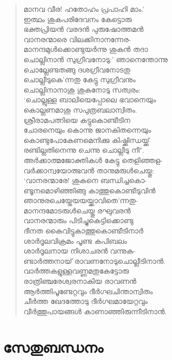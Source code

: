 \begin{verse}
മാനവ വീര! ഹതോഹം പ്രപാഹി മാം.’\\
ഇത്ഥം ശുകപരിദേവനം കേട്ടൊരു\\
ഭക്തപ്രിയന്‍ വരദന്‍ പുരുഷോത്തമന്‍\\
വാനരന്മാരെ വിലക്കിനാനന്നേര-\\
മാനന്ദമുള്‍ക്കൊണ്ടുയര്‍ന്നു ശുകന്‍ തദാ\\
ചൊല്ലിനാന്‍ സുഗ്രീവനോടു:’ ഞാനെന്തോന്നു\\
ചൊല്ലേണ്ടതങ്ങു ദശഗ്രീവനോടതു\\
ചൊല്ലീടുകെ’ന്നതു കേട്ടു സുഗ്രീവനും\\
ചൊല്ലിനാനാശു ശുകനോടു സത്വരം:\\
‘ചൊല്ലുള്ള ബാലിയെപ്പോലെ ഭവാനെയും\\
കൊല്ലണമാശു സപുത്രബലാന്വിതം.\\
ശ്രീരാമപത്നിയെ കട്ടുകൊണ്ടീടിന\\
ചോരനെയും കൊന്നു ജാനകിതന്നെയും\\
കൊണ്ടുപോകേണമെനിക്കു കിഷ്ക്കിന്ധയ്ക്ക്\\
രണ്ടില്ലതിനെന്നു ചെന്നു ചൊല്ലീടു നീ".\\
അര്‍ക്കാത്മജോക്തികള്‍ കേട്ടു തെളിഞ്ഞള-\\
വര്‍ക്കാന്വയോത്ഭവന്‍ താനുമരുള്‍ചെയ്തു:\\
‘വാനരന്മാരേ! ശുകനെ ബന്ധിച്ചകൊ-\\
ണ്ടൂനമൊഴിഞ്ഞിങ്ങു കാത്തുകൊണ്ടീടുവിന്‍\\
ഞാനുരചെയ്തേയയയ്ക്കാവിതെ’ന്നതു-\\
മാനന്ദമോടരുള്‍ചെയ്തു രഘുവരന്‍\\
വാനരന്മാരും പിടിച്ചുകെട്ടിക്കൊണ്ടു\\
ദീനത കൈവിട്ടുകാത്തുകൊണ്ടീടിനാര്‍\\
ശാര്‍ദൂലവിക്രമം പൂണ്ട കപിബലം\\
ശാര്‍ദൂലനായ നിശാചരന്‍ വന്നുക-\\
ണ്ടാര്‍ത്തനായ് രാവണനോടുചൊല്ലീടിനാന്‍.\\
വാര്‍ത്തകളുള്ളവണ്ണമതുകേട്ടോരു\\
രാത്രിഞ്ചരേശ്വരനാകിയ രാവണന്‍\\
ആര്‍ത്തിപൂണ്ടേറ്റവും ദീര്‍ഗ്ഘചിന്താന്വിതം\\
ചീര്‍ത്ത ഖേദത്തോടു ദീര്‍ഗ്ഘമായേറ്റവും\\
വീര്‍ത്തുപായങ്ങള്‍ കാണാഞ്ഞിരുന്നീടിനാന്‍.
\end{verse}


\section{സേതുബന്ധനം}

